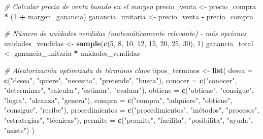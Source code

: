 \documentclass[
]{article}
\newenvironment{Shaded}{\begin{snugshade}}{\end{snugshade}}
\newcommand{\AttributeTok}[1]{\textcolor[rgb]{0.13,0.29,0.53}{#1}}
\newcommand{\CommentTok}[1]{\textcolor[rgb]{0.56,0.35,0.01}{\textit{#1}}}
\newcommand{\DecValTok}[1]{\textcolor[rgb]{0.00,0.00,0.81}{#1}}
\newcommand{\FunctionTok}[1]{\textcolor[rgb]{0.13,0.29,0.53}{\textbf{#1}}}
\newcommand{\NormalTok}[1]{#1}
\newcommand{\OtherTok}[1]{\textcolor[rgb]{0.56,0.35,0.01}{#1}}
\newcommand{\SpecialCharTok}[1]{\textcolor[rgb]{0.81,0.36,0.00}{\textbf{#1}}}
\newcommand{\StringTok}[1]{\textcolor[rgb]{0.31,0.60,0.02}{#1}}
\begin{document}
\begin{Shaded}
\begin{Highlighting}[]
\CommentTok{\# Calcular precio de venta basado en el margen}
\NormalTok{precio\_venta }\OtherTok{\textless{}{-}}\NormalTok{ precio\_compra }\SpecialCharTok{*}\NormalTok{ (}\DecValTok{1} \SpecialCharTok{+}\NormalTok{ margen\_ganancia)}
\NormalTok{ganancia\_unitaria }\OtherTok{\textless{}{-}}\NormalTok{ precio\_venta }\SpecialCharTok{{-}}\NormalTok{ precio\_compra}

\CommentTok{\# Número de unidades vendidas (matemáticamente relevante) {-} más opciones}
\NormalTok{unidades\_vendidas }\OtherTok{\textless{}{-}} \FunctionTok{sample}\NormalTok{(}\FunctionTok{c}\NormalTok{(}\DecValTok{5}\NormalTok{, }\DecValTok{8}\NormalTok{, }\DecValTok{10}\NormalTok{, }\DecValTok{12}\NormalTok{, }\DecValTok{15}\NormalTok{, }\DecValTok{20}\NormalTok{, }\DecValTok{25}\NormalTok{, }\DecValTok{30}\NormalTok{), }\DecValTok{1}\NormalTok{)}
\NormalTok{ganancia\_total }\OtherTok{\textless{}{-}}\NormalTok{ ganancia\_unitaria }\SpecialCharTok{*}\NormalTok{ unidades\_vendidas}

\CommentTok{\# Aleatorización optimizada de términos clave}
\NormalTok{tipos\_terminos }\OtherTok{\textless{}{-}} \FunctionTok{list}\NormalTok{(}
  \AttributeTok{desea =} \FunctionTok{c}\NormalTok{(}\StringTok{"desea"}\NormalTok{, }\StringTok{"quiere"}\NormalTok{, }\StringTok{"necesita"}\NormalTok{, }\StringTok{"pretende"}\NormalTok{, }\StringTok{"busca"}\NormalTok{),}
  \AttributeTok{conocer =} \FunctionTok{c}\NormalTok{(}\StringTok{"conocer"}\NormalTok{, }\StringTok{"determinar"}\NormalTok{, }\StringTok{"calcular"}\NormalTok{, }\StringTok{"estimar"}\NormalTok{, }\StringTok{"evaluar"}\NormalTok{),}
  \AttributeTok{obtiene =} \FunctionTok{c}\NormalTok{(}\StringTok{"obtiene"}\NormalTok{, }\StringTok{"consigue"}\NormalTok{, }\StringTok{"logra"}\NormalTok{, }\StringTok{"alcanza"}\NormalTok{, }\StringTok{"genera"}\NormalTok{),}
  \AttributeTok{compra =} \FunctionTok{c}\NormalTok{(}\StringTok{"compra"}\NormalTok{, }\StringTok{"adquiere"}\NormalTok{, }\StringTok{"obtiene"}\NormalTok{, }\StringTok{"consigue"}\NormalTok{, }\StringTok{"recibe"}\NormalTok{),}
  \AttributeTok{procedimientos =} \FunctionTok{c}\NormalTok{(}\StringTok{"procedimientos"}\NormalTok{, }\StringTok{"métodos"}\NormalTok{, }\StringTok{"procesos"}\NormalTok{, }\StringTok{"estrategias"}\NormalTok{, }\StringTok{"técnicas"}\NormalTok{),}
  \AttributeTok{permite =} \FunctionTok{c}\NormalTok{(}\StringTok{"permite"}\NormalTok{, }\StringTok{"facilita"}\NormalTok{, }\StringTok{"posibilita"}\NormalTok{, }\StringTok{"ayuda"}\NormalTok{, }\StringTok{"asiste"}\NormalTok{)}
\NormalTok{)}


\end{Highlighting}
\end{Shaded}
\end{document}
